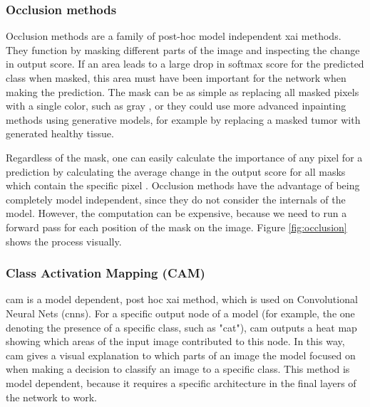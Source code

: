 \documentclass[UKenglish]{uiomasterthesis} %
\theoremstyle{definition}
\begin{document}
\subsubsection{Occlusion methods}

Occlusion methods are a family of post-hoc model independent \ac{xai} methods. They function by masking different parts of the image and inspecting the change in output score. If an area leads to a large drop in softmax score for the predicted class when masked, this area must have been important for the network when making the prediction. The mask can be as simple as replacing all masked pixels with a single color, such as gray \cite{occlusion}, or they could use more advanced inpainting methods using generative models, for example by replacing a masked tumor with generated healthy tissue. 

Regardless of the mask, one can easily calculate the importance of any pixel for a prediction by calculating the average change in the output score for all masks which contain the specific pixel \cite{diagnostic}. Occlusion methods have the advantage of being completely model independent, since they do not consider the internals of the model. However, the computation can be expensive, because we need to run a forward pass for each position of the mask on the image. Figure \ref{fig:occlusion} shows the process visually.

\subsubsection{Class Activation Mapping (CAM)}

\ac{cam} \cite{cam} is a model dependent, post hoc \ac{xai} method, which is used on Convolutional Neural Nets (\ac{cnn}s). For a specific output node of a model (for example, the one denoting the presence of a specific class, such as "cat"), \ac{cam} outputs a heat map showing which areas of the input image contributed to this node. In this way, \ac{cam} gives a visual explanation to which parts of an image the model focused on when making a decision to classify an image to a specific class. This method is model dependent, because it requires a specific architecture in the final layers of the network to work.
\end{document}
